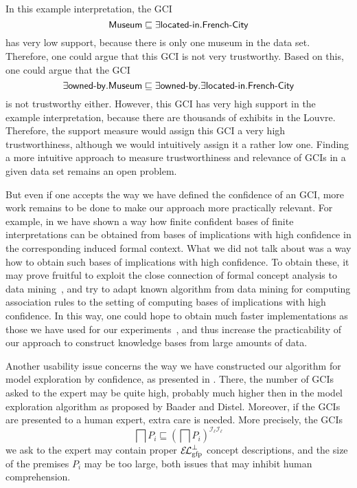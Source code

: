 In this example interpretation, the GCI
\begin{equation*}
  \mathsf{Museum} \sqsubseteq \exists \text{\textsf{located-in}}. \text{\textsf{French-City}}
\end{equation*}
has very low support, because there is only one museum in the data set.  Therefore, one
could argue that this GCI is not very trustworthy.  Based on this, one could argue that
the GCI
\begin{equation*}
  \exists \text{\textsf{owned-by}}. \mathsf{Museum} \sqsubseteq \exists
  \text{\textsf{owned-by}}. \exists \text{\textsf{located-in}}. \text{\textsf{French-City}}
\end{equation*}
is not trustworthy either.  However, this GCI has very high support in the example
interpretation, because there are thousands of exhibits in the Louvre.  Therefore, the
support measure would assign this GCI a very high trustworthiness, although we would
intuitively assign it a rather low one.  Finding a more intuitive approach to measure
trustworthiness and relevance of GCIs in a given data set remains an open problem.

But even if one accepts the way we have defined the confidence of an GCI, more work
remains to be done to make our approach more practically relevant.  For example, in
 we have shown a
way how finite confident bases of finite interpretations can be obtained from bases of
implications with high confidence in the corresponding induced formal context.  What we
did not talk about was a way how to obtain such bases of implications with high
confidence.  To obtain these, it may prove fruitful to exploit the close connection of
formal concept analysis to data mining~\cite{arules:Zaki:1998}, and try to adapt known
algorithm from data mining for computing association rules to the setting of computing
bases of implications with high confidence.  In this way, one could hope to obtain much
faster implementations as those we have used for our
experiments~\cite{DBLP:conf/icdm/BorchmannD11}, and thus increase the practicability of
our approach to construct knowledge bases from large amounts of data.

Another usability issue concerns the way we have constructed our algorithm for model
exploration by confidence, as presented in .  There, the number
of GCIs asked to the expert may be quite high, probably much higher then in the model
exploration algorithm as proposed by Baader and Distel.  Moreover, if the GCIs are
presented to a human expert, extra care is needed.  More precisely, the GCIs
\begin{equation*}
  \bigsqcap P_{i} \sqsubseteq (\bigsqcap P_{i})^{\mathcal{I}_{\ell}\mathcal{I}_{\ell}}
\end{equation*}
we ask to the expert may contain proper $\ELgfpbot$ concept descriptions, and the size of
the premises $P_{i}$ may be too large, both issues that may inhibit human comprehension.

